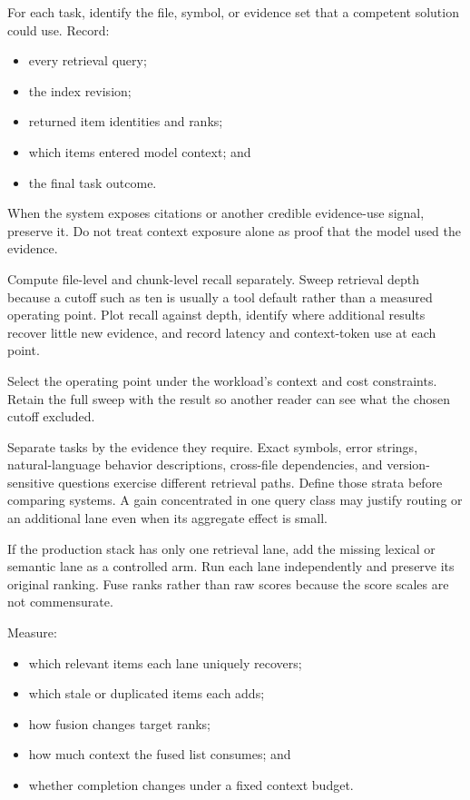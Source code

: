 For each task, identify the file, symbol, or evidence set that a competent solution could use. Record:

\begin{itemize}
\tightlist
\item
  every retrieval query;
\item
  the index revision;
\item
  returned item identities and ranks;
\item
  which items entered model context; and
\item
  the final task outcome.
\end{itemize}

When the system exposes citations or another credible evidence-use signal, preserve it. Do not treat context exposure alone as proof that the model used the evidence.

Compute file-level and chunk-level recall separately. Sweep retrieval depth because a cutoff such as ten is usually a tool default rather than a measured operating point. Plot recall against depth, identify where additional results recover little new evidence, and record latency and context-token use at each point.

Select the operating point under the workload's context and cost constraints. Retain the full sweep with the result so another reader can see what the chosen cutoff excluded.

Separate tasks by the evidence they require. Exact symbols, error strings, natural-language behavior descriptions, cross-file dependencies, and version-sensitive questions exercise different retrieval paths. Define those strata before comparing systems. A gain concentrated in one query class may justify routing or an additional lane even when its aggregate effect is small.

If the production stack has only one retrieval lane, add the missing lexical or semantic lane as a controlled arm. Run each lane independently and preserve its original ranking. Fuse ranks rather than raw scores because the score scales are not commensurate.

Measure:

\begin{itemize}
\tightlist
\item
  which relevant items each lane uniquely recovers;
\item
  which stale or duplicated items each adds;
\item
  how fusion changes target ranks;
\item
  how much context the fused list consumes; and
\item
  whether completion changes under a fixed context budget.
\end{itemize}

